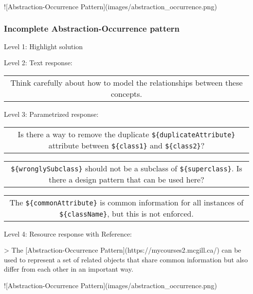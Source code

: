 ![Abstraction-Occurrence Pattern](images/abstraction_occurrence.png)


\subsubsection{Incomplete Abstraction-Occurrence pattern}

\noindent Level 1: Highlight solution \medskip

\noindent Level 2: Text response: \medskip

\begin{tabular}{|c}
Think carefully about how to model the relationships between these concepts.
\end{tabular} \medskip

\noindent Level 3: Parametrized response: \medskip

\begin{tabular}{|c}
Is there a way to remove the duplicate \verb|${duplicateAttribute}| attribute between \verb|${class1}| and \verb|${class2}|?
\end{tabular} \medskip

\begin{tabular}{|c}
\verb|${wronglySubclass}| should not be a subclass of \verb|${superclass}|. Is there a design pattern that can be used here?
\end{tabular} \medskip

\begin{tabular}{|c}
The \verb|${commonAttribute}| is common information for all instances of \verb|${className}|, but this is not enforced.
\end{tabular} \medskip

\noindent Level 4: Resource response with Reference:

> The [Abstraction-Occurrence Pattern](https://mycourses2.mcgill.ca/) can be used to 
represent a set of related objects that share common information but also differ
from each other in an important way.

![Abstraction-Occurrence Pattern](images/abstraction_occurrence.png)



